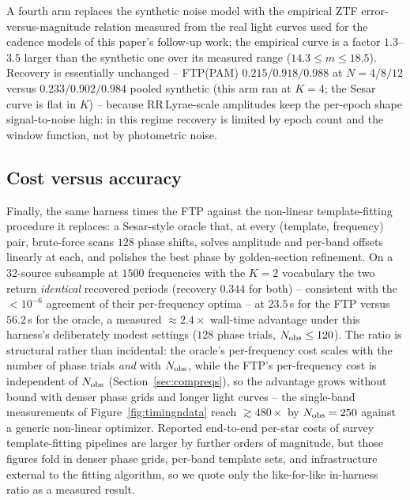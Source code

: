 \documentclass[apj]{emulateapj}
\begin{document}
A fourth arm replaces the synthetic noise model with the empirical ZTF
error-versus-magnitude relation measured from the real light curves
used for the cadence models of this paper's follow-up work; the
empirical curve is a factor $1.3$--$3.5$ larger than the synthetic one
over its measured range ($14.3 \leq m \leq 18.5$).  Recovery is
essentially unchanged -- FTP(PAM) $0.215/0.918/0.988$ at $N = 4/8/12$
versus $0.233/0.902/0.984$ pooled synthetic (this arm ran at $K = 4$;
the Sesar curve is flat in $K$) -- because RR\,Lyrae-scale amplitudes
keep the per-epoch shape signal-to-noise high: in this regime recovery
is limited by epoch count and the window function, not by photometric
noise.

\subsection{Cost versus accuracy}
\label{sec:simval-cost}

Finally, the same harness times the FTP against the non-linear
template-fitting procedure it replaces: a Sesar-style oracle
\citep[cf.][]{Sesar_etal_2010,Sesar_etal_2016} that, at every
(template, frequency) pair, brute-force scans $128$ phase shifts,
solves amplitude and per-band offsets linearly at each, and polishes
the best phase by golden-section refinement.  On a $32$-source
subsample at $1500$ frequencies with the $K = 2$ vocabulary the two
return \emph{identical} recovered periods (recovery $0.344$ for both)
-- consistent with the $<10^{-6}$ agreement of their per-frequency
optima -- at $23.5$\,s for the FTP versus $56.2$\,s for the oracle, a
measured ${\approx}2.4\times$ wall-time advantage under this harness's
deliberately modest settings ($128$ phase trials, $N_{\rm obs} \leq
120$).  The ratio is structural rather than incidental: the oracle's
per-frequency cost scales with the number of phase trials \emph{and}
with $N_{\rm obs}$, while the FTP's per-frequency cost is independent
of $N_{\rm obs}$ (Section~\ref{sec:compreqs}), so the advantage grows
without bound with denser phase grids and longer light curves --
the single-band measurements of Figure~\ref{fig:timingndata} reach
${\gtrsim}480\times$ by $N_{\rm obs} = 250$ against a generic
non-linear optimizer.  Reported end-to-end per-star costs of
survey template-fitting pipelines are larger by further orders of
magnitude, but those figures fold in denser phase grids, per-band
template sets, and infrastructure external to the fitting algorithm,
so we quote only the like-for-like in-harness ratio as a measured
result.
\end{document}
